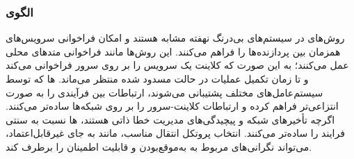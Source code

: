 \subsubsection{الگوی }
\label{distrRemMethodCallSec}
\begin{RTL}
روش‌های   در سیستم‌های بی‌درنگ نهفته
مشابه   هستند
و امکان فراخوانی سرویس‌های همزمان بین پردازنده‌ها را فراهم می‌کنند.
این روش‌ها مانند فراخوانی متدهای محلی عمل می‌کنند؛
به این صورت که کلاینت یک سرویس را بر روی سرور فراخوانی می‌کند
و تا زمان تکمیل عملیات در حالت مسدود شده منتظر
می‌ماند. ها که توسط سیستم‌عامل‌های مختلف پشتیبانی می‌شوند،
ارتباطات بین فرآیندی  را به صورت انتزاعی‌تر
فراهم کرده و ارتباطات کلاینت-سرور را بر روی
شبکه‌ها ساده‌تر می‌کنند. اگرچه تأخیرهای شبکه
و پیچیدگی‌های مدیریت خطا ذاتی هستند، ها نسبت به
 سنتی فرایند را ساده‌تر می‌کنند. انتخاب پروتکل
انتقال مناسب، مانند  به جای  غیرقابل‌اعتماد،
می‌تواند نگرانی‌های مربوط به به‌موقع‌بودن و قابلیت اطمینان را برطرف کند.
\end{RTL}